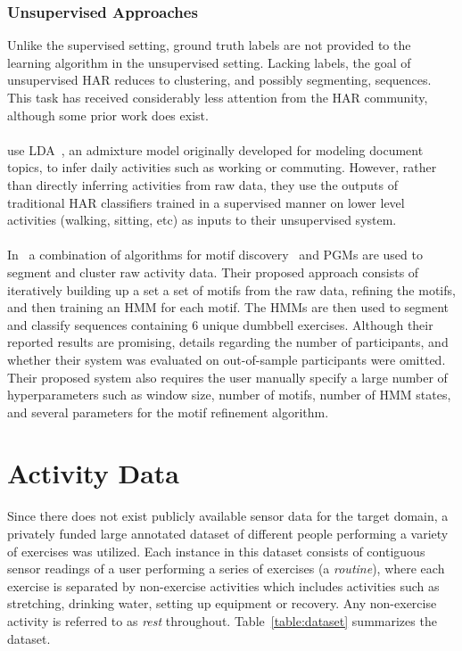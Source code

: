 \documentclass[12pt]{report}
\newcommand{\1}[0]{\mathbbm{1}}
\begin{document}
\subsection{Unsupervised Approaches}
Unlike the supervised setting, ground truth labels are not provided to the learning
algorithm in the unsupervised setting. Lacking labels, the goal of unsupervised \ac{HAR}
reduces to clustering, and possibly segmenting, sequences. This task has received considerably
less attention from the \ac{HAR} community, although some prior work does exist.
\\\\
\cite{har-topic-models} use \ac{LDA}~\cite{lda-blei}, an admixture model originally
developed for modeling document topics, to infer daily activities such as working or
commuting. However, rather than directly inferring activities from raw data, they use the
outputs of traditional \ac{HAR} classifiers trained in a supervised manner on lower level
activities (walking, sitting, etc) as inputs to their unsupervised system.
\\\\
In~\cite{hmm-motifs} a combination of algorithms for motif discovery~\cite{motif-algo} and \acp{PGM}
are used to segment and cluster raw activity data. Their proposed approach consists of
iteratively building up a set a set of motifs from the raw data, refining the motifs,
and then training an \ac{HMM} for each motif. The \acp{HMM} are then used to segment and classify
sequences containing 6 unique dumbbell exercises. Although their reported results are promising,
details regarding the number of participants, and whether their system was evaluated on
out-of-sample participants were omitted. Their proposed system also requires the user manually
specify a large number of hyperparameters such as window size, number of motifs, number of \ac{HMM} states,
and several parameters for the motif refinement algorithm.

\chapter{Activity Data}
\label{chap:Activity Data}
Since there does not exist publicly available sensor data for the target domain, a privately funded
large annotated dataset of different people performing a variety of exercises was utilized.
Each instance in this dataset consists of contiguous sensor readings of a user performing a
series of exercises (a \emph{routine}), where each exercise is separated by non-exercise activities
which includes activities such as stretching, drinking water, setting up  equipment or recovery.
Any non-exercise activity is referred to as \emph{rest} throughout. Table~\ref{table:dataset} summarizes
the dataset.
\end{document}
